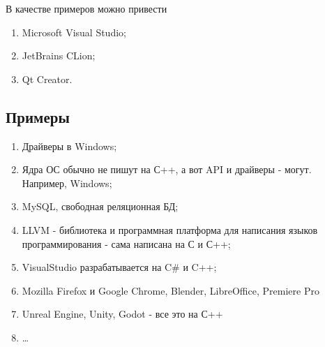В качестве примеров можно привести
\begin{enumerate}
  \item Microsoft Visual Studio;
  \item JetBrains CLion;
  \item Qt Creator.
\end{enumerate}

\subsection{Примеры}\label{examples_3}

\begin{enumerate}
\item
  Драйверы в Windows;
\item
  Ядра ОС обычно не пишут на С++, а вот API и драйверы - могут.
  Например, Windows;
\item
  MySQL, свободная реляционная БД;
\item
  LLVM - библиотека и программная платформа для написания языков
  программирования - сама написана на С и С++;
\item
  VisualStudio разрабатывается на C\# и C++;
\item
  Mozilla Firefox и Google Chrome, Blender, LibreOffice, Premiere Pro
\item
  Unreal Engine, Unity, Godot - все это на С++
\item
  \ldots{}
\end{enumerate}
